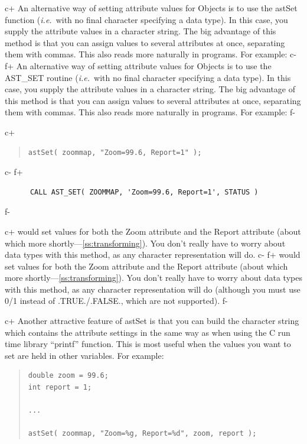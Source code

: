 \documentclass[twoside,11pt]{article}
\newcommand{\secref}[1]{\S\ref{#1}}
\renewcommand{\secref}[1]{\ref{#1}}
\begin{document}
c+
An alternative way of setting attribute values for Objects is to use
the astSet function ({\em{i.e.}}\ with no final character specifying a
data type). In this case, you supply the attribute values in a
character string. The big advantage of this method is that you can
assign values to several attributes at once, separating them with
commas. This also reads more naturally in programs. For example:
c-
f+
An alternative way of setting attribute values for Objects is to use
the AST\_SET routine ({\em{i.e.}}\ with no final character specifying
a data type). In this case, you supply the attribute values in a
character string. The big advantage of this method is that you can
assign values to several attributes at once, separating them with
commas. This also reads more naturally in programs. For example:
f-

c+
\begin{quote}
\small
\begin{verbatim}
astSet( zoommap, "Zoom=99.6, Report=1" );
\end{verbatim}
\normalsize
\end{quote}
c-
f+
\small
\begin{verbatim}
      CALL AST_SET( ZOOMMAP, 'Zoom=99.6, Report=1', STATUS )
\end{verbatim}
\normalsize
f-

c+
would set values for both the Zoom attribute and the Report attribute
(about which more shortly---\secref{ss:transforming}). You don't really
have to worry about data types with this method, as any character
representation will do.
c-
f+
would set values for both the Zoom attribute and the Report attribute
(about which more shortly---\secref{ss:transforming}). You don't really
have to worry about data types with this method, as any character
representation will do (although you must use 0/1 instead of
.TRUE./.FALSE., which are not supported).
f-

c+
Another attractive feature of astSet is that you can build the
character string which contains the attribute settings in the same way
as when using the C run time library ``printf'' function. This is most
useful when the values you want to set are held in other
variables. For example:

\begin{quote}
\small
\begin{verbatim}
double zoom = 99.6;
int report = 1;

...

astSet( zoommap, "Zoom=%g, Report=%d", zoom, report );
\end{verbatim}
\normalsize
\end{quote}
\end{document}
